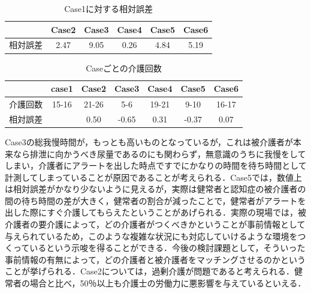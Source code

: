 \begin{table}[htb]
  \caption[Case1に対する相対誤差]{Case1に対する相対誤差}
  \label{relative_error}
  \centering
  \begin{tabular}{r|c|c|c|c|c}
     & Case2 & Case3 & Case4 & Case5 & Case6 \\ \hline
    相対誤差 & 2.47 & 9.05 & 0.26 & 4.84 & 5.19 \\
    \end{tabular}
\end{table}


\begin{table}[htb]
  \caption[Caseごとの介護回数]{Caseごとの介護回数}
  \label{number_of_care}
  \centering
  \begin{tabular}{r|c|c|c|c|c|c}
     & case1 & Case2 & Case3 & Case4 & Case5 & Case6 \\ \hline
    介護回数 & 15-16 & 21-26 & 5-6 & 19-21 & 9-10 & 16-17 \\
    相対誤差 & & 0.50 & -0.65 & 0.31 & -0.37 & 0.07 \\
    \end{tabular}
\end{table}

Case3の総我慢時間が，もっとも高いものとなっているが，これは被介護者が本来なら排泄に向かうべき尿量であるのにも関わらず，無意識のうちに我慢をしてしまい，介護者にアラートを出した時点ですでにかなりの時間を待ち時間として計測してしまっていることが原因であることが考えられる．Case5では，数値上は相対誤差がかなり少ないように見えるが，実際は健常者と認知症の被介護者の間の待ち時間の差が大きく，健常者の割合が減ったことで，健常者がアラートを出した際にすぐ介護してもらえたということがあげられる．実際の現場では，被介護者の要介護によって，どの介護者がつくべきかということが事前情報として与えられているため，このような複雑な状況にも対応していけるような環境をつくっているという示唆を得ることができる．今後の検討課題として，そういった事前情報の有無によって，どの介護者と被介護者をマッチングさせるのかということが挙げられる．Case2については，過剰介護が問題であると考えられる．健常者の場合と比べ，50％以上も介護士の労働力に悪影響を与えているといえる．
